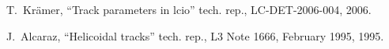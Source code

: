 \documentclass[12pt]{article}
\begin{document}
\begin{footnotesize}
\begin{thebibliography}{10}
T.~Kr{\"a}mer, ``Track parameters in lcio'' tech. rep., LC-DET-2006-004, 2006.

J.~Alcaraz, ``Helicoidal tracks'' tech. rep., L3 Note 1666, February 1995,
  1995.

\end{thebibliography}\endgroup
\end{footnotesize}
\end{document}
